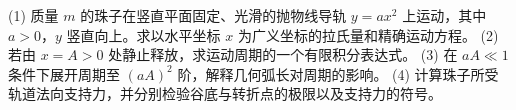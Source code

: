 (1) 质量 \(m\) 的珠子在竖直平面固定、光滑的抛物线导轨 \(y=ax^2\) 上运动，其中 \(a>0\)，\(y\) 竖直向上。求以水平坐标 \(x\) 为广义坐标的拉氏量和精确运动方程。
(2) 若由 \(x=A>0\) 处静止释放，求运动周期的一个有限积分表达式。
(3) 在 \(aA\ll1\) 条件下展开周期至 \((aA)^2\) 阶，解释几何弧长对周期的影响。
(4) 计算珠子所受轨道法向支持力，并分别检验谷底与转折点的极限以及支持力的符号。
